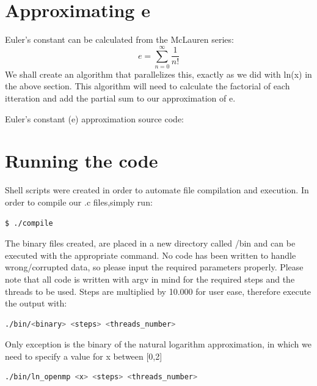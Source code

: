 \documentclass{article}
\begin{document}



\section{Approximating e}

Euler's constant can be calculated from the McLauren series:
\begin{equation}
	e = \sum_{n=0}^{\infty}\frac{1}{n!}
\end{equation}
We shall create an algorithm that parallelizes this, exactly as we did with ln(x) in the above section.
This algorithm will need to calculate the factorial of each itteration and add the partial sum to our approximation of e.
\begin{center}
	Euler's constant (e) approximation source code:
\end{center}



\newpage
\section*{Running the code} %

Shell scripts were created in order to automate file compilation and execution. In order to compile our .c files,simply run:
\begin{lstlisting}[language=bash]
	$ ./compile
\end{lstlisting}

The binary files created, are placed in a new directory called /bin and can be executed with the appropriate command. 
No code has been written to handle wrong/corrupted data, so please input the required parameters properly.
Please note that all code is written with argv in mind for the required steps and the threads to be used. Steps are multiplied by 10.000 for user ease, therefore execute the output with:
\begin{lstlisting}[language=bash]
	./bin/<binary> <steps> <threads_number>
\end{lstlisting}
Only exception is the binary of the natural logarithm approximation,
in which we need to specify a value for x between [0,2]
\begin{lstlisting}[language=bash]
	./bin/ln_openmp <x> <steps> <threads_number>
\end{lstlisting}
\newpage
\end{document}
